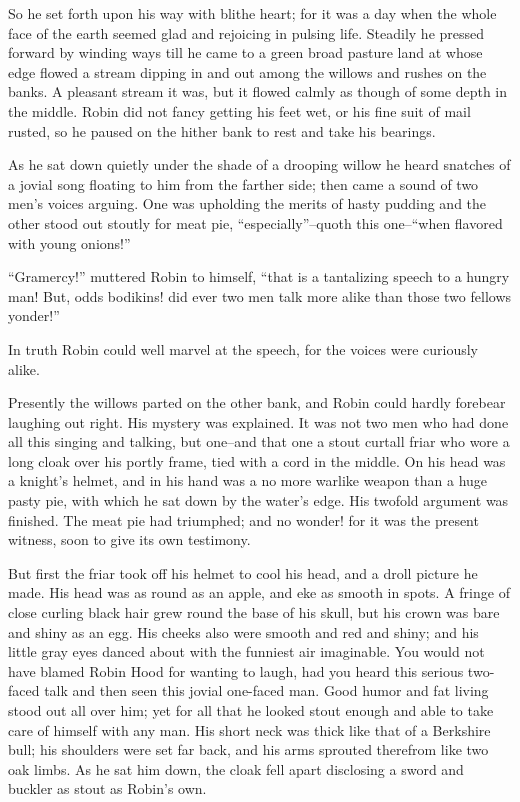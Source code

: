 So he set forth upon his way with blithe heart; for it was a day when
the whole face of the earth seemed glad and rejoicing in pulsing life.
Steadily he pressed forward by winding ways till he came to a green
broad pasture land at whose edge flowed a stream dipping in and out
among the willows and rushes on the banks. A pleasant stream it was, but
it flowed calmly as though of some depth in the middle. Robin did not
fancy getting his feet wet, or his fine suit of mail rusted, so he
paused on the hither bank to rest and take his bearings.

As he sat down quietly under the shade of a drooping willow he heard
snatches of a jovial song floating to him from the farther side; then
came a sound of two men's voices arguing. One was upholding the merits
of hasty pudding and the other stood out stoutly for meat pie,
``especially''--quoth this one--``when flavored with young onions!''

``Gramercy!'' muttered Robin to himself, ``that is a tantalizing speech
to a hungry man! But, odds bodikins! did ever two men talk more alike
than those two fellows yonder!''

In truth Robin could well marvel at the speech, for the voices were
curiously alike.

Presently the willows parted on the other bank, and Robin could hardly
forebear laughing out right. His mystery was explained. It was not two
men who had done all this singing and talking, but one--and that one a
stout curtall friar who wore a long cloak over his portly frame, tied
with a cord in the middle. On his head was a knight's helmet, and in his
hand was a no more warlike weapon than a huge pasty pie, with which he
sat down by the water's edge. His twofold argument was finished. The
meat pie had triumphed; and no wonder! for it was the present witness,
soon to give its own testimony.

But first the friar took off his helmet to cool his head, and a droll
picture he made. His head was as round as an apple, and eke as smooth in
spots. A fringe of close curling black hair grew round the base of his
skull, but his crown was bare and shiny as an egg. His cheeks also were
smooth and red and shiny; and his little gray eyes danced about with the
funniest air imaginable. You would not have blamed Robin Hood for
wanting to laugh, had you heard this serious two-faced talk and then
seen this jovial one-faced man. Good humor and fat living stood out all
over him; yet for all that he looked stout enough and able to take care
of himself with any man. His short neck was thick like that of a
Berkshire bull; his shoulders were set far back, and his arms sprouted
therefrom like two oak limbs. As he sat him down, the cloak fell apart
disclosing a sword and buckler as stout as Robin's own.

